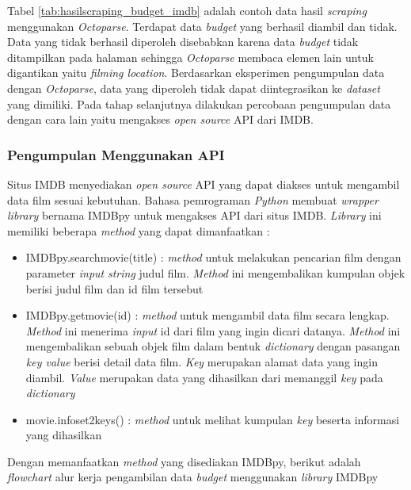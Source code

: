 Tabel \ref{tab:hasilscraping_budget_imdb} adalah contoh data hasil \textit{scraping} menggunakan \textit{Octoparse}. Terdapat data \textit{budget} yang berhasil diambil dan tidak. Data yang tidak berhasil diperoleh disebabkan karena data \textit{budget} tidak ditampilkan pada halaman sehingga \textit{Octoparse} membaca elemen lain untuk digantikan yaitu \textit{filming location}. Berdasarkan eksperimen pengumpulan data dengan \textit{Octoparse}, data yang diperoleh tidak dapat diintegrasikan ke \textit{dataset} yang dimiliki. Pada tahap selanjutnya dilakukan percobaan pengumpulan data dengan cara lain yaitu mengakses  \textit{open source} API dari IMDB.
 

\subsubsection{Pengumpulan Menggunakan API}
Situs IMDB menyediakan \textit{open source} API yang dapat diakses untuk mengambil data film sesuai kebutuhan. Bahasa pemrograman \textit{Python} membuat \textit{wrapper library} bernama IMDBpy untuk mengakses API dari situs IMDB. \textit{Library} ini memiliki beberapa \textit{method} yang dapat dimanfaatkan :

\begin{itemize}
\item IMDBpy.search\textunderscore movie(title) : \textit{method} untuk melakukan pencarian film dengan parameter \textit{input} \textit{string} judul film. \textit{Method} ini mengembalikan kumpulan objek berisi judul film dan id film tersebut 

\item IMDBpy.get\textunderscore movie(id) : \textit{method} untuk mengambil data film secara lengkap. \textit{Method} ini menerima \textit{input} id dari film yang ingin dicari datanya. \textit{Method} ini mengembalikan sebuah objek film dalam bentuk \textit{dictionary} dengan pasangan \textit{key value} berisi detail data film. \textit{Key} merupakan alamat data yang ingin diambil. \textit{Value} merupakan data yang dihasilkan dari memanggil \textit{key} pada \textit{dictionary}

\item movie.infoset2keys() : \textit{method} untuk melihat kumpulan \textit{key} beserta informasi yang dihasilkan
\end{itemize}

Dengan memanfaatkan \textit{method} yang disediakan IMDBpy, berikut adalah \textit{flowchart} alur kerja pengambilan data \textit{budget} menggunakan \textit{library } IMDBpy

